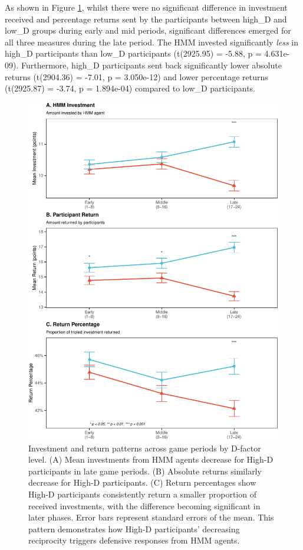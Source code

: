 \documentclass[
]{article}
\begin{document}
As shown in Figure \ref{fig:gamesPlot2}, whilst there were no significant difference in investment received and percentage returns sent by the participants between high\_D and low\_D groups during early and mid periods, significant differences emerged for all three measures during the late period. The HMM invested significantly \emph{less} in high\_D participants than low\_D participants (t(2925.95) = -5.88, p = 4.631e-09). Furthermore, high\_D participants sent back significantly lower absolute returns (t(2904.36) = -7.01, p = 3.050e-12) and lower percentage returns (t(2925.87) = -3.74, p = 1.894e-04) compared to low\_D participants.

\begin{figure}
\includegraphics[width=0.9\linewidth]{article_files/figure-latex/gamesPlot2-1} \caption{Investment and return patterns across game periods by D-factor level. (A) Mean investments from HMM agents decrease for High-D participants in late game periods. (B) Absolute returns similarly decrease for High-D participants. (C) Return percentages show High-D participants consistently return a smaller proportion of received investments, with the difference becoming significant in later phases. Error bars represent standard errors of the mean. This pattern demonstrates how High-D participants' decreasing reciprocity triggers defensive responses from HMM agents.}\label{fig:gamesPlot2}
\end{figure}
\end{document}
